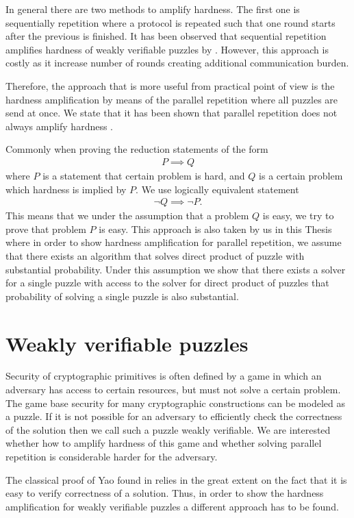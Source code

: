 \documentclass[11pt,a4paper,titlepage]{memoir}
\begin{document}
In general there are two methods to amplify hardness.
The first one is sequentially repetition where a protocol is repeated such that one round starts after the previous is finished.
It has been observed that sequential repetition amplifies hardness of weakly verifiable puzzles by \cite{von2003captcha}.
However, this approach is costly as it increase number of rounds creating additional communication burden.

Therefore, the approach that is more useful from practical point of view is the hardness amplification by means of the
parallel repetition where all puzzles are send at once. We state that it has been shown that parallel repetition
does not always amplify hardness \cite{bellare1997does}.

Commonly when proving the reduction statements of the form
\begin{align*}
  P \implies Q
\end{align*}
where $P$ is a statement that certain problem is hard, and $Q$ is a certain problem which hardness is implied by $P$.
We use logically equivalent statement
\begin{align*}
  \lnot Q \implies \lnot P.
\end{align*}
This means that we under the assumption that a problem $Q$ is easy, we try to prove that problem $P$ is easy.
This approach is also taken by us in this Thesis where in order to show hardness amplification for parallel repetition,
we assume that there exists an algorithm that solves direct product of puzzle with substantial probability.
Under this assumption we show that there exists a solver for a single puzzle with access to the solver for direct product of puzzles that
probability of solving a single puzzle is also substantial.

\section{Weakly verifiable puzzles}
Security of cryptographic primitives is often defined by
a game in which an adversary has access to certain resources, but must not solve a certain problem.
The game base security for many cryptographic constructions can be modeled as a puzzle.
If it is not possible for an adversary to efficiently check the correctness of the solution then
we call such a puzzle weakly verifiable. We are interested whether how to amplify hardness of this game
and whether solving parallel repetition is considerable harder for the adversary.

The classical proof of Yao found in \cite{Goldreich:2000:FCB:519078} relies in the great extent on the fact that
it is easy to verify correctness of a solution.
Thus, in order to show the hardness amplification for weakly verifiable puzzles a different approach has to be found.
\end{document}
